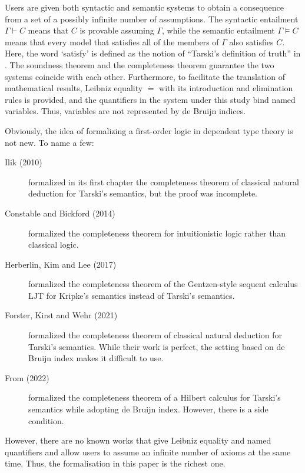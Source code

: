 \documentclass[twocolumn]{article}
\theoremstyle{definition}
\theoremstyle{definition}
\theoremstyle{definition}
\theoremstyle{definition}
\theoremstyle{definition}
\theoremstyle{definition}
\theoremstyle{definition}
\newcommand{\0}{\texttt{0}}
\newcommand{\1}{\texttt{1}}
\newcommand{\Leq}{\mathrel{\dot{=}}}
\begin{document}
Users are given both syntactic and semantic systems to obtain a consequence from a set of a possibly infinite number of assumptions.
The syntactic entailment $\Gamma \vdash C$ means that $C$ is provable assuming $\Gamma$,
while the semantic entailment $\Gamma \vDash C$ means that every model that satisfies all of the members of $\Gamma$ also satisfies $C$.
Here, the word `satisfy' is defined as the notion of ``Tarski's definition of truth'' in .
The soundness theorem and the completeness theorem guarantee the two systems coincide with each other.
Furthermore, to facilitate the translation of mathematical results, Leibniz equality $\Leq$ with its introduction and elimination rules is provided, and the quantifiers in the system under this study bind named variables. Thus, variables are not represented by de Bruijn indices.

Obviously, the idea of formalizing a first-order logic in dependent type theory is not new. To name a few:
\begin{description}
  \item[Ilik (2010) \cite{ilik2010}] formalized in its first chapter the completeness theorem of classical natural deduction for Tarski's semantics, but the proof was incomplete.

  \item[Constable and Bickford (2014) \cite{constable2014}] formalized the completeness theorem for intuitionistic logic rather than classical logic.

  \item[Herberlin, Kim and Lee (2017) \cite{herberlin2017}]  formalized the completeness theorem of the Gentzen-style sequent calculus LJT for Kripke's semantics instead of Tarski's semantics.

  \item[Forster, Kirst and Wehr (2021) \cite{forster2021}] formalized the completeness theorem of classical natural deduction for Tarski's semantics. While their work is perfect, the setting based on de Bruijn index makes it difficult to use.

  \item[From (2022) \cite{halkjaer2022}] formalized the completeness theorem of a Hilbert calculus for Tarski's semantics while adopting de Bruijn index. However, there is a side condition.
\end{description}

However, there are no known works that give Leibniz equality and named quantifiers and allow users to assume an infinite number of axioms at the same time. Thus, the formalisation in this paper is the richest one.
\end{document}
